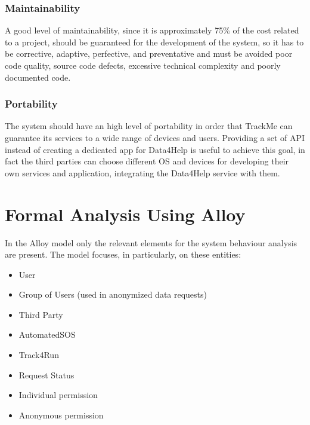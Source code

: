 \documentclass[a4paper]{article}
\begin{document}
    \subsubsection{Maintainability}
    
    A good level of maintainability, since it is approximately 75\% of the cost related to a project, should be guaranteed for the development of the system, so it has to be corrective, adaptive, perfective, and preventative and
    must be avoided poor code quality, source code defects, excessive technical complexity and poorly documented code.
    
    \subsubsection{Portability}
    
    The system should have an high level of portability in order that TrackMe can guarantee its services to a wide range of devices and users.
    Providing a set of API instead of creating a dedicated app for Data4Help is useful to achieve this goal, in fact the third parties can choose different OS and devices for developing their own services and application, integrating the Data4Help service with them.
    
    \section{Formal Analysis Using Alloy}
    In the Alloy model only the relevant elements for the system behaviour analysis are present. The model focuses, in particularly, on these entities:

    \begin{itemize}
        \item User
        \item Group of Users (used in anonymized data requests)
        \item Third Party
        \item AutomatedSOS
        \item Track4Run
        \item Request Status
        \item Individual permission
        \item Anonymous permission      
    \end{itemize}
\end{document}
